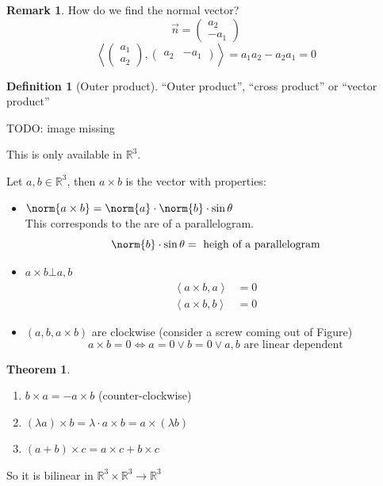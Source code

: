\documentclass[a4paper,landscape,twocolumn]{article}
\newcommand\functional[1]{\left\langle{#1}\right\rangle}
\theoremstyle{definition}
\newtheorem{theorem}{Theorem}
\newtheorem{defi}{Definition}
\newtheorem{rem}{Remark}
\DeclarePairedDelimiter\norm\lVert\rVert
\begin{document}
\begin{rem}
  How do we find the normal vector?
  \[ \vec{n} = \begin{pmatrix} a_2 \\ -a_1 \end{pmatrix} \]
  \[ \functional{\begin{pmatrix} a_1 \\ a_2 \end{pmatrix}, \begin{pmatrix} a_2 & -a_1 \end{pmatrix}} = a_1 a_2 - a_2 a_1 = 0 \]
\end{rem}

\begin{defi}[Outer product]
  \enquote{Outer product}, \enquote{cross product} or \enquote{vector product}

  TODO: image missing

  This is only available in $\mathbb R^3$.

  Let $a,b \in \mathbb R^3$, then $a \times b$ is the vector with properties:
  \begin{itemize}
    \item $\norm{a \times b} = \norm{a} \cdot \norm{b} \cdot \sin\theta$ \\
      This corresponds to the are of a parallelogram.
      \[ \norm{b} \cdot \sin\theta = \text{ heigh of a parallelogram} \]
    \item $a \times b \bot a,b$
      \begin{align*}
        \functional{a \times b, a} &= 0 \\
        \functional{a \times b, b} &= 0
      \end{align*}
    \item $(a,b,a\times b)$ are clockwise (consider a screw coming out of Figure)
      \[ a \times b = 0 \Leftrightarrow a = 0 \lor b = 0 \lor a,b \text{ are linear dependent} \]
  \end{itemize}
\end{defi}

\begin{theorem}
  \label{satz-8.8}
  \begin{enumerate}
    \item $b \times a = - a \times b$ (counter-clockwise)
    \item $(\lambda a) \times b = \lambda \cdot a \times b = a \times (\lambda b)$
    \item $(a + b) \times c = a \times c + b \times c$
  \end{enumerate}
  So it is bilinear in $\mathbb R^3 \times \mathbb R^3 \to \mathbb R^3$
\end{theorem}
\end{document}

